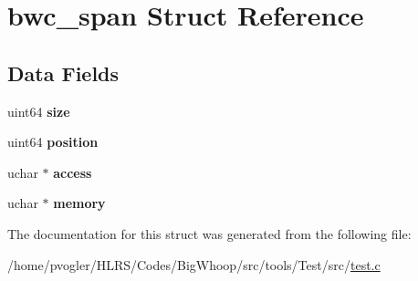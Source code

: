 \hypertarget{structbwc__span}{}\section{bwc\+\_\+span Struct Reference}
\label{structbwc__span}
\subsection*{Data Fields}
\begin{DoxyCompactItemize}
\item 
\mbox{\label{structbwc__span_a8ca59724dc78f797cdfb82538e314a58}} 
uint64 {\bfseries size}
\item 
\mbox{\label{structbwc__span_a70369d31efa7888a276ea9eaa9c6dc08}} 
uint64 {\bfseries position}
\item 
\mbox{\label{structbwc__span_a2e925d6e39c8ea9bc7229585893c159a}} 
uchar $\ast$ {\bfseries access}
\item 
\mbox{\label{structbwc__span_a3b9fc884d0e3333d9831fdf7627c17c4}} 
uchar $\ast$ {\bfseries memory}
\end{DoxyCompactItemize}


The documentation for this struct was generated from the following file\+:\begin{DoxyCompactItemize}
\item 
/home/pvogler/\+H\+L\+R\+S/\+Codes/\+Big\+Whoop/src/tools/\+Test/src/\mbox{\hyperlink{test_8c}{test.\+c}}\end{DoxyCompactItemize}
